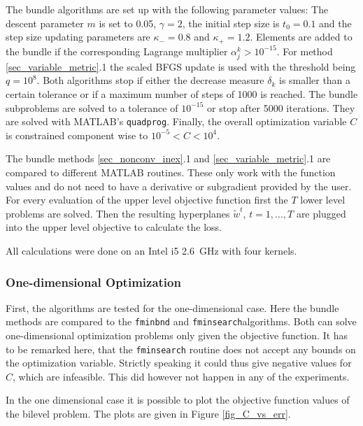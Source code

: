 The bundle algorithms are set up with the following parameter values: The descent parameter \(m\) is set to 0.05, \(\gamma = 2\), the initial step size is \(t_0 = 0.1\) and the step size updating parameters are \(\kappa_{-} = 0.8\) and \(\kappa_{+}=1.2\).
Elements are added to the bundle if the corresponding Lagrange multiplier \(\alpha^k_j > 10^{-15}\).
For method \ref{sec_variable_metric}.1 the scaled BFGS update is used with the threshold being \(q=10^8\).
Both algorithms stop if either the decrease measure \(\delta_k\) is smaller than a certain tolerance or if a maximum number of steps of 1000 is reached. The bundle subproblems are solved to a tolerance of \(10^{-15}\) or stop after 5000 iterations. They are solved with MATLAB's \texttt{quadprog}.
Finally, the overall optimization variable \(C\) is constrained component wise to \(10^{-5} < C < 10^4\).


The bundle methods \ref{sec_nonconv_inex}.1 and \ref{sec_variable_metric}.1 are compared to different MATLAB routines.
These only work with the function values and do not need to have a derivative or subgradient provided by the user.
For every evaluation of the upper level objective function first the \(T\) lower level problems are solved. Then the resulting hyperplanes \(\tilde{w}^t\), \(t=1,...,T\) are plugged into the upper level objective to calculate the loss.

All calculations were done on an Intel i5 2.6~GHz with four kernels.


\subsubsection{One-dimensional Optimization}

First, the algorithms are tested for the one-dimensional case.
Here the bundle methods are compared to the \texttt{fminbnd} and \texttt{fminsearch}algorithms. Both can solve one-dimensional optimization problems only given the objective function.
It has to be remarked here, that the \texttt{fminsearch} routine does not accept any bounds on the optimization variable. Strictly speaking it could thus give negative values for \(C\), which are infeasible. This did however not happen in any of the experiments.

In the one dimensional case it is possible to plot the objective function values of the bilevel problem. The plots are given in Figure \ref{fig_C_vs_err}.

